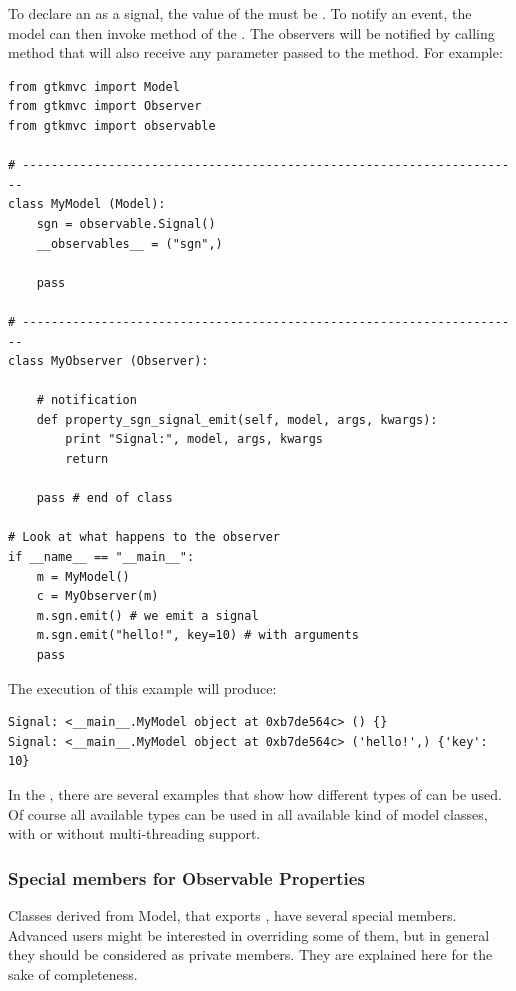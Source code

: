 To declare an \OP as a signal, the value of the \OP must be
. To notify an event, the model
can then invoke method  of the \OP. The observers will
be notified by calling method
 that will also receive any
parameter passed to the  method. For example:

{ \codesize 
\begin{verbatim} 
from gtkmvc import Model
from gtkmvc import Observer
from gtkmvc import observable

# ----------------------------------------------------------------------
class MyModel (Model):
    sgn = observable.Signal()
    __observables__ = ("sgn",)

    pass

# ----------------------------------------------------------------------
class MyObserver (Observer):

    # notification
    def property_sgn_signal_emit(self, model, args, kwargs):
        print "Signal:", model, args, kwargs
        return

    pass # end of class

# Look at what happens to the observer
if __name__ == "__main__":
    m = MyModel()
    c = MyObserver(m)
    m.sgn.emit() # we emit a signal
    m.sgn.emit("hello!", key=10) # with arguments
    pass
\end{verbatim}
}

The execution of this example will produce:

{ \codesize 
\begin{verbatim} 
Signal: <__main__.MyModel object at 0xb7de564c> () {}
Signal: <__main__.MyModel object at 0xb7de564c> ('hello!',) {'key': 10}
\end{verbatim}
}

In the , there are several examples that show how
different types of \OPS can be used. Of course all available types can
be used in all available kind of model classes, with or without
multi-threading support.

  
\subsubsection{Special members for Observable Properties}
Classes derived from Model, that exports \OPS, have several special
members. Advanced users might be interested in overriding some of them,
but in general they should be considered as private members. They are
explained here for the sake of completeness.


